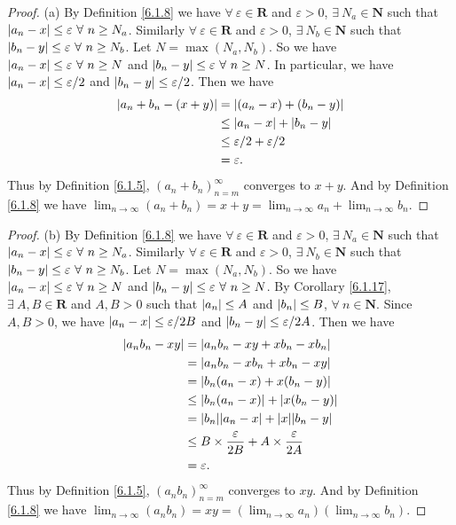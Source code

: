 \begin{proof}{(a)}
By Definition \ref{6.1.8} we have \(\forall\ \varepsilon \in \mathbf{R}\) and \(\varepsilon > 0\), \(\exists\ N_a \in \mathbf{N}\) such that \(\abs*{a_n - x} \leq \varepsilon \ \forall\ n \geq N_a\).
Similarly \(\forall\ \varepsilon \in \mathbf{R}\) and \(\varepsilon > 0\), \(\exists\ N_b \in \mathbf{N}\) such that \(\abs*{b_n - y} \leq \varepsilon \ \forall\ n \geq N_b\).
Let \(N = \max(N_a, N_b)\).
So we have \(\abs*{a_n - x} \leq \varepsilon \ \forall\ n \geq N\) and \(\abs*{b_n - y} \leq \varepsilon \ \forall\ n \geq N\).
In particular, we have \(\abs*{a_n - x} \leq \varepsilon / 2\) and \(\abs*{b_n - y} \leq \varepsilon / 2\).
Then we have
\begin{align*}
\abs*{a_n + b_n - (x + y)} &= \abs*{(a_n - x) + (b_n - y)} \\
&\leq \abs*{a_n - x} + \abs*{b_n - y} \\
&\leq \varepsilon / 2 + \varepsilon / 2 \\
&= \varepsilon.
\end{align*}
Thus by Definition \ref{6.1.5}, \((a_n + b_n)_{n = m}^\infty\) converges to \(x + y\).
And by Definition \ref{6.1.8} we have \(\lim_{n \to \infty} (a_n + b_n) = x + y = \lim_{n \to \infty} a_n + \lim_{n \to \infty} b_n\).
\end{proof}

\begin{proof}{(b)}
By Definition \ref{6.1.8} we have \(\forall\ \varepsilon \in \mathbf{R}\) and \(\varepsilon > 0\), \(\exists\ N_a \in \mathbf{N}\) such that \(\abs*{a_n - x} \leq \varepsilon \ \forall\ n \geq N_a\).
Similarly \(\forall\ \varepsilon \in \mathbf{R}\) and \(\varepsilon > 0\), \(\exists\ N_b \in \mathbf{N}\) such that \(\abs*{b_n - y} \leq \varepsilon \ \forall\ n \geq N_b\).
Let \(N = \max(N_a, N_b)\).
So we have \(\abs*{a_n - x} \leq \varepsilon \ \forall\ n \geq N\) and \(\abs*{b_n - y} \leq \varepsilon \ \forall\ n \geq N\).
By Corollary \ref{6.1.17}, \(\exists\ A, B \in \mathbf{R}\) and \(A, B > 0\) such that \(\abs*{a_n} \leq A\) and \(\abs*{b_n} \leq B\), \(\forall\ n \in \mathbf{N}\).
Since \(A, B > 0\), we have \(\abs*{a_n - x} \leq \varepsilon / 2B\) and \(\abs*{b_n - y} \leq \varepsilon / 2A\).
Then we have
\begin{align*}
\abs*{a_n b_n - x y} &= \abs*{a_n b_n - x y + x b_n - x b_n} \\
&= \abs*{a_n b_n - x b_n + x b_n - x y} \\
&= \abs*{b_n(a_n - x) + x(b_n - y)} \\
&\leq \abs*{b_n(a_n - x)} + \abs*{x(b_n - y)} \\
&= \abs*{b_n}\abs*{a_n - x} + \abs*{x}\abs*{b_n - y} \\
&\leq B \times \frac{\varepsilon}{2B} + A \times \frac{\varepsilon}{2A} \\
&= \varepsilon.
\end{align*}
Thus by Definition \ref{6.1.5}, \((a_n b_n)_{n = m}^\infty\) converges to \(x y\).
And by Definition \ref{6.1.8} we have \(\lim_{n \to \infty} (a_n b_n) = x y = (\lim_{n \to \infty} a_n)(\lim_{n \to \infty} b_n)\).
\end{proof}

